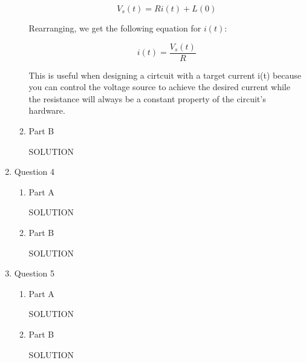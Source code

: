 \documentclass[12pt]{article}
\begin{document}
\begin{enumerate}
\begin{enumerate}
    \[
    V_s(t) = Ri(t) + L(0)
    \]

    Rearranging, we get the following equation for $i(t)$:

    \[
    i(t) = \frac{V_s(t)}{R}
    \]

    This is useful when designing a cirtcuit with a target current i(t) because you can control the voltage source to achieve the desired current while the resistance will always be a constant property of the circuit's hardware. 

  

  \item Part B  %

  SOLUTION
  \end{enumerate}
\newpage

\item Question 4
  \begin{enumerate}
  \item Part A  %

  SOLUTION

  \item Part B  %

  SOLUTION
  \end{enumerate}
\newpage

\item Question 5
  \begin{enumerate}
  \item Part A  %

  SOLUTION

  \item Part B  %

  SOLUTION
  \end{enumerate}
\newpage

\end{enumerate}
\end{document}
